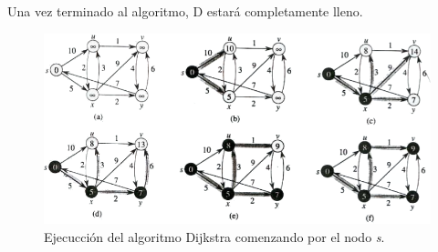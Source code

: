 Una vez terminado al algoritmo, D estará completamente lleno.

\begin{figure}[h]
	\centering 
	\includegraphics[scale=0.55]{img/algoritmo_dijkstra}
	\caption{Ejecucción del algoritmo Dijkstra comenzando por el nodo {\em s}.}
	\label{contexto:figura}
\end{figure}